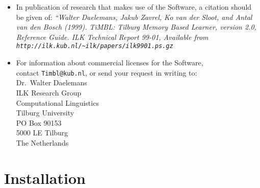 \documentclass{report}
\begin{document}
\begin{itemize}
\item In publication of research that makes use of the Software, a
citation should be given of: {\em ``Walter Daelemans, Jakub Zavrel, Ko
van der Sloot, and Antal van den Bosch (1999). TiMBL: Tilburg Memory
Based Learner, version 2.0, Reference Guide. ILK Technical Report
99-01, Available from {\tt
http://ilk.kub.nl/\~{}ilk/papers/ilk9901.ps.gz}}

\item For information about commercial licenses for the Software,\\
contact {\tt Timbl@kub.nl}, or send your request in writing to:\\

Dr.~Walter Daelemans\\
ILK Research Group\\
Computational Linguistics\\
Tilburg University\\
PO Box 90153\\
5000 LE Tilburg\\
The Netherlands\\

\end{itemize}

\pagestyle{headings}

\chapter{Installation}
\end{document}
